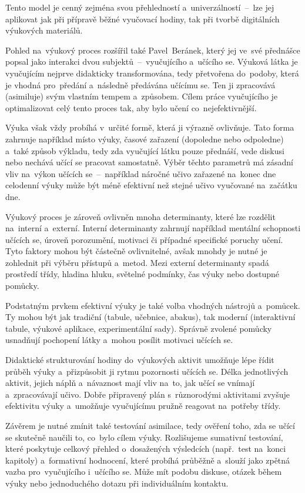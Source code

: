 \documentclass[male,czech,api_bc]{kitheses}
\begin{document}
Tento model je cenný zejména svou přehledností a~univerzálností~--~lze jej aplikovat jak při přípravě běžné vyučovací hodiny, tak při tvorbě digitálních výukových materiálů. 

Pohled na~výukový proces rozšířil také Pavel~Beránek, který jej ve~své přednášce popsal jako interakci dvou subjektů~--~vyučujícího a~učícího se. Výuková látka je vyučujícím nejprve didakticky transformována, tedy přetvořena do~podoby, která je vhodná pro~předání a~následně předávána učícímu se. Ten ji zpracovává (asimiluje) svým vlastním tempem a~způsobem. Cílem práce vyučujícího je optimalizovat celý tento proces tak, aby bylo učení co~nejefektivnější.

Výuka však vždy probíhá v~určité formě, která ji výrazně ovlivňuje. Tato forma zahrnuje například místo výuky, časové zařazení (dopoledne nebo odpoledne) a~také způsob výkladu, tedy zda vyučující látku pouze přednáší, vede diskusi nebo nechává učící se pracovat samostatně. Výběr těchto parametrů má zásadní vliv na~výkon učících se~--~například náročné učivo zařazené na~konec dne celodenní výuky může být méně efektivní než stejné učivo vyučované na~začátku dne.

Výukový proces je zároveň ovlivněn mnoha determinanty, které lze rozdělit na~interní a~externí. Interní determinanty zahrnují například mentální schopnosti učících se, úroveň porozumění, motivaci či případné specifické poruchy učení. Tyto faktory mohou být částečně ovlivnitelné, avšak mnohdy je nutné je zohlednit při výběru přístupů a~metod. Mezi externí determinanty spadá prostředí třídy, hladina hluku, světelné podmínky, čas výuky nebo dostupné pomůcky.

Podstatným prvkem efektivní výuky je také volba vhodných nástrojů a~pomůcek. Ty mohou být jak tradiční (tabule, učebnice, abakus), tak moderní (interaktivní tabule, výukové aplikace, experimentální sady). Správně zvolené pomůcky usnadňují pochopení látky a~mohou posílit motivaci učících se.

Didaktické strukturování hodiny do~výukových aktivit umožňuje lépe řídit průběh výuky a~přizpůsobit ji rytmu pozornosti učících se. Délka jednotlivých aktivit, jejich náplň a~návaznost mají vliv na~to, jak učící se vnímají a~zpracovávají učivo. Dobře připravený plán s~různorodými aktivitami zvyšuje efektivitu výuky a~umožňuje vyučujícímu pružně reagovat na~potřeby třídy.

Závěrem je nutné zmínit také testování asimilace, tedy ověření toho, zda se učící se skutečně naučili to, co~bylo cílem výuky. Rozlišujeme sumativní testování, které poskytuje celkový přehled o~dosažených výsledcích (např.~test na~konci kapitoly) a~formativní hodnocení, které probíhá průběžně a~slouží jako zpětná vazba pro~vyučujícího i~učícího se. Může mít podobu diskuse, otázek během výuky nebo jednoduchého dotazu při individuálním kontaktu.
\end{document}
